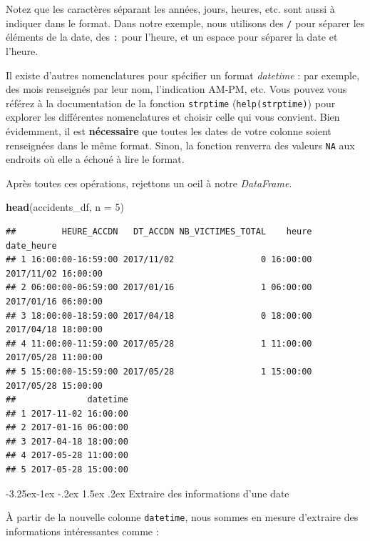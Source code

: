 \documentclass[
  11pt,
  french,
]{book}
\makeatletter
\newenvironment{Shaded}{\begin{snugshade}}{\end{snugshade}}
\newcommand{\DataTypeTok}[1]{\textcolor[rgb]{0.13,0.29,0.53}{#1}}
\newcommand{\DecValTok}[1]{\textcolor[rgb]{0.00,0.00,0.81}{#1}}
\newcommand{\KeywordTok}[1]{\textcolor[rgb]{0.13,0.29,0.53}{\textbf{#1}}}
\newcommand{\NormalTok}[1]{#1}
\newenvironment{kframe}{%
\medskip{}
\setlength{\fboxsep}{.8em}
 \def\at@end@of@kframe{}%
 \ifinner\ifhmode%
  \def\at@end@of@kframe{\end{minipage}}%
  \begin{minipage}{\columnwidth}%
 \fi\fi%
 \def\FrameCommand##1{\hskip\@totalleftmargin \hskip-\fboxsep
 \colorbox{shadecolor}{##1}\hskip-\fboxsep
     \hskip-\linewidth \hskip-\@totalleftmargin \hskip\columnwidth}%
 \MakeFramed {\advance\hsize-\width
   \@totalleftmargin\z@ \linewidth\hsize
   \@setminipage}}%
 {\par\unskip\endMakeFramed%
 \at@end@of@kframe}
\renewenvironment{Shaded}{\begin{kframe}}{\end{kframe}}
\renewcommand\paragraph{\@startsection{paragraph}{4}{\z@}%
   {-3.25ex\@plus -1ex \@minus -.2ex}%
   {1.5ex \@plus .2ex}%
   {\normalfont\normalsize\bfseries}}
\makeatother
\begin{document}
Notez que les caractères séparant les années, jours, heures, etc. sont aussi à indiquer dans le format. Dans notre exemple, nous utilisons des \texttt{/} pour séparer les éléments de la date, des \texttt{:} pour l'heure, et un espace pour séparer la date et l'heure.

Il existe d'autres nomenclatures pour spécifier un format \emph{datetime} : par exemple, des mois renseignés par leur nom, l'indication AM-PM, etc. Vous pouvez vous référez à la documentation de la fonction \texttt{strptime} (\texttt{help(strptime)}) pour explorer les différentes nomenclatures et choisir celle qui vous convient. Bien évidemment, il est \textbf{nécessaire} que toutes les dates de votre colonne soient renseignées dans le même format. Sinon, la fonction renverra des valeurs \texttt{NA} aux endroits où elle a échoué à lire le format.

Après toutes ces opérations, rejettons un oeil à notre \emph{DataFrame}.

\begin{Shaded}
\begin{Highlighting}[]
\KeywordTok{head}\NormalTok{(accidents_df, }\DataTypeTok{n =} \DecValTok{5}\NormalTok{)}
\end{Highlighting}
\end{Shaded}

\begin{verbatim}
##         HEURE_ACCDN   DT_ACCDN NB_VICTIMES_TOTAL    heure          date_heure
## 1 16:00:00-16:59:00 2017/11/02                 0 16:00:00 2017/11/02 16:00:00
## 2 06:00:00-06:59:00 2017/01/16                 1 06:00:00 2017/01/16 06:00:00
## 3 18:00:00-18:59:00 2017/04/18                 0 18:00:00 2017/04/18 18:00:00
## 4 11:00:00-11:59:00 2017/05/28                 1 11:00:00 2017/05/28 11:00:00
## 5 15:00:00-15:59:00 2017/05/28                 1 15:00:00 2017/05/28 15:00:00
##              datetime
## 1 2017-11-02 16:00:00
## 2 2017-01-16 06:00:00
## 3 2017-04-18 18:00:00
## 4 2017-05-28 11:00:00
## 5 2017-05-28 15:00:00
\end{verbatim}

\hypertarget{sect014262}{%
\paragraph{Extraire des informations d'une date}\label{sect014262}}

À partir de la nouvelle colonne \texttt{datetime}, nous sommes en mesure d'extraire des informations intéressantes comme :
\end{document}
